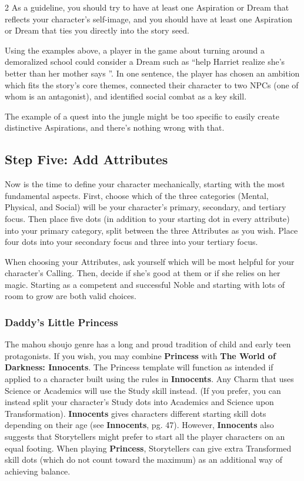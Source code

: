 \begin{multicols}{2}
As a guideline, you should try to have at least one Aspiration or Dream that reflects your character's self-image, and you should have at least one Aspiration or Dream that ties you directly into the story seed. 

Using the examples above, a player in the game about turning around a demoralized school could consider a Dream such as \textquotedblleft help Harriet realize she's better than her mother says \textquotedblright. In one sentence, the player has chosen an ambition which fits the story's core themes, connected their character to two NPCs (one of whom is an antagonist), and identified social combat as a key skill.

The example of a quest into the jungle might be too specific to easily create distinctive Aspirations, and there's nothing wrong with that. 

\subsection*{Step Five: Add Attributes}

Now is the time to define your character mechanically, starting with the most fundamental aspects. First, choose which of the three categories (Mental, Physical, and Social) will be your character's primary, secondary, and tertiary focus. Then place five dots (in addition to your starting dot in every attribute) into your primary category, split between the three Attributes as you wish. Place four dots into your secondary focus and three into your tertiary focus. 

When choosing your Attributes, ask yourself which will be most helpful for your character's Calling. Then, decide if she's good at them or if she relies on her magic. Starting as a competent and successful Noble and starting with lots of room to grow are both valid choices. 


\bigsidebarstart

\subsubsection*{Daddy's Little Princess}

The mahou shoujo genre has a long and proud tradition of child and early teen protagonists. If you wish, you may combine \textbf{Princess} with \textbf{The World of Darkness: Innocents}. The Princess template will function as intended if applied to a character built using the rules in \textbf{Innocents}. Any Charm that uses Science or Academics will use the Study skill instead. (If you prefer, you can instead split your character's Study dots into Academics and Science upon Transformation). \textbf{Innocents} gives characters different starting skill dots depending on their age (see \textbf{Innocents}, pg. 47). However, \textbf{Innocents} also suggests that Storytellers might prefer to start all the player characters on an equal footing. When playing \textbf{Princess}, Storytellers can give extra Transformed skill dots (which do not count toward the maximum) as an additional way of achieving balance. 


\end{multicols}
